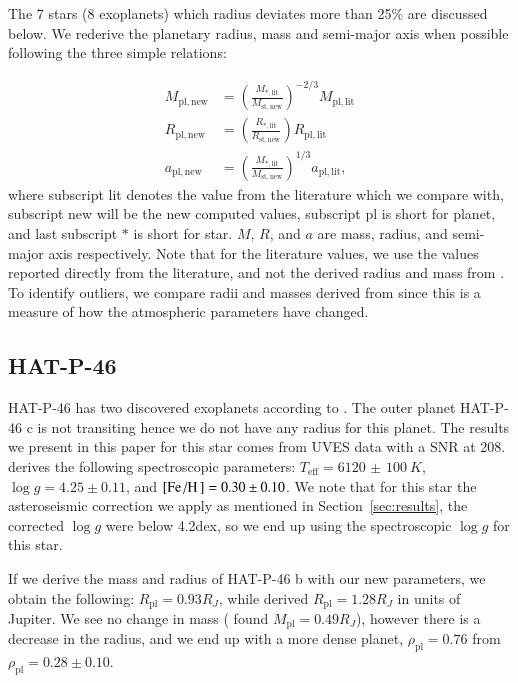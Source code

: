 \documentclass{aa}
\begin{document}
The 7 stars (8 exoplanets) which radius deviates more than 25\% are discussed
below. We rederive the planetary radius, mass and semi-major axis when possible
following the three simple relations:

\begin{align}
    M_\mathrm{pl,new} &= \left(\frac{M_\mathrm{\ast,lit}}{M_\mathrm{st,new}}\right)^{-2/3} M_\mathrm{pl,lit}  \\
    R_\mathrm{pl,new} &= \left(\frac{R_\mathrm{\ast,lit}}{R_\mathrm{st,new}}\right) R_\mathrm{pl,lit} \\
    a_\mathrm{pl,new} &= \left(\frac{M_\mathrm{\ast,lit}}{M_\mathrm{st,new}}\right)^{1/3} a_\mathrm{pl,lit},
\end{align}
where subscript lit denotes the value from the literature which we compare with,
subscript new will be the new computed values, subscript pl is short for planet,
and last subscript $\ast$ is short for star. $M$, $R$, and $a$ are mass, radius,
and semi-major axis respectively. Note that for the literature values, we use
the values reported directly from the literature, and not the derived radius and
mass from \citet{Torres2010}. To identify outliers, we compare radii and masses
derived from \citet{Torres2010} since this is a measure of how the atmospheric
parameters have changed.

\subsection{HAT-P-46}
\label{sub:HAT-P-46}
HAT-P-46 has two discovered exoplanets according to \citet{Hartmann2014}. The
outer planet HAT-P-46 c is not transiting hence we do not have any radius for
this planet. The results we present in this paper for this star comes from UVES
data with a SNR at 208. \citet{Hartmann2014} derives the following spectroscopic
parameters: $T_\mathrm{eff}=\SI{6120(100)}{K}$, $\log g=4.25\pm0.11$, and
$[\ion{Fe}/\ion{H}]=0.30\pm0.10$. We note that for this star the asteroseismic
correction we apply as mentioned in Section~\ref{sec:results}, the corrected
$\log g$ were below 4.2dex, so we end up using the spectroscopic $\log g$ for
this star.

If we derive the mass and radius of HAT-P-46 b with our new parameters, we
obtain the following: $R_\mathrm{pl} = 0.93R_J$, while \citet{Hartmann2014}
derived $R_\mathrm{pl} = 1.28R_J$ in units of Jupiter. We see no change in mass
(\citet{Hartmann2014} found $M_\mathrm{pl}=0.49R_J$), however there is a
decrease in the radius, and we end up with a more dense planet,
$\rho_\mathrm{pl}=0.76$ from $\rho_\mathrm{pl}=0.28\pm0.10$.
\end{document}
